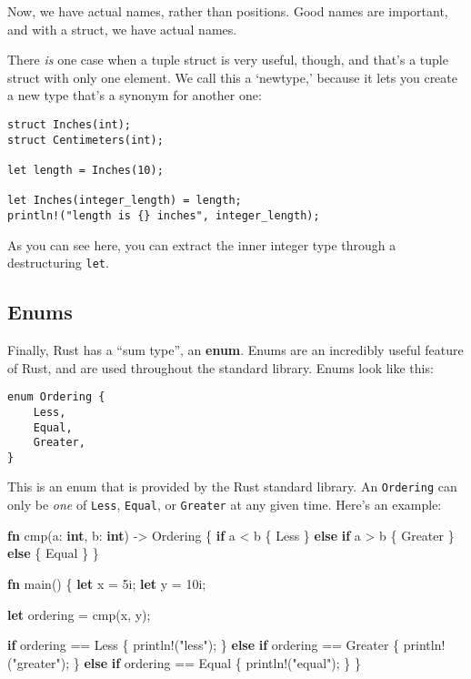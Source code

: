 \documentclass[]{article}
\newenvironment{Shaded}{}{}
\newcommand{\KeywordTok}[1]{\textcolor[rgb]{0.00,0.44,0.13}{\textbf{{#1}}}}
\newcommand{\DecValTok}[1]{\textcolor[rgb]{0.25,0.63,0.44}{{#1}}}
\newcommand{\StringTok}[1]{\textcolor[rgb]{0.25,0.44,0.63}{{#1}}}
\newcommand{\OtherTok}[1]{\textcolor[rgb]{0.00,0.44,0.13}{{#1}}}
\newcommand{\NormalTok}[1]{{#1}}
\begin{document}
Now, we have actual names, rather than positions. Good names are
important, and with a struct, we have actual names.

There \emph{is} one case when a tuple struct is very useful, though, and
that's a tuple struct with only one element. We call this a `newtype,'
because it lets you create a new type that's a synonym for another one:

\begin{verbatim}
struct Inches(int);
struct Centimeters(int);

let length = Inches(10);

let Inches(integer_length) = length;
println!("length is {} inches", integer_length);
\end{verbatim}

As you can see here, you can extract the inner integer type through a
destructuring \texttt{let}.

\subsection{Enums}\label{enums}

Finally, Rust has a ``sum type'', an \textbf{enum}. Enums are an
incredibly useful feature of Rust, and are used throughout the standard
library. Enums look like this:

\begin{verbatim}
enum Ordering {
    Less,
    Equal,
    Greater,
}
\end{verbatim}

This is an enum that is provided by the Rust standard library. An
\texttt{Ordering} can only be \emph{one} of \texttt{Less},
\texttt{Equal}, or \texttt{Greater} at any given time. Here's an
example:

\begin{Shaded}
\begin{Highlighting}[]
\KeywordTok{fn} \NormalTok{cmp(a: }\KeywordTok{int}\NormalTok{, b: }\KeywordTok{int}\NormalTok{) -> Ordering \{}
    \KeywordTok{if} \NormalTok{a < b \{ Less \}}
    \KeywordTok{else} \KeywordTok{if} \NormalTok{a > b \{ Greater \}}
    \KeywordTok{else} \NormalTok{\{ Equal \}}
\NormalTok{\}}

\KeywordTok{fn} \NormalTok{main() \{}
    \KeywordTok{let} \NormalTok{x = }\DecValTok{5i}\NormalTok{;}
    \KeywordTok{let} \NormalTok{y = }\DecValTok{10i}\NormalTok{;}

    \KeywordTok{let} \NormalTok{ordering = cmp(x, y);}

    \KeywordTok{if} \NormalTok{ordering == Less \{}
        \OtherTok{println!}\NormalTok{(}\StringTok{"less"}\NormalTok{);}
    \NormalTok{\} }\KeywordTok{else} \KeywordTok{if} \NormalTok{ordering == Greater \{}
        \OtherTok{println!}\NormalTok{(}\StringTok{"greater"}\NormalTok{);}
    \NormalTok{\} }\KeywordTok{else} \KeywordTok{if} \NormalTok{ordering == Equal \{}
        \OtherTok{println!}\NormalTok{(}\StringTok{"equal"}\NormalTok{);}
    \NormalTok{\}}
\NormalTok{\}}
\end{Highlighting}
\end{Shaded}
\end{document}
